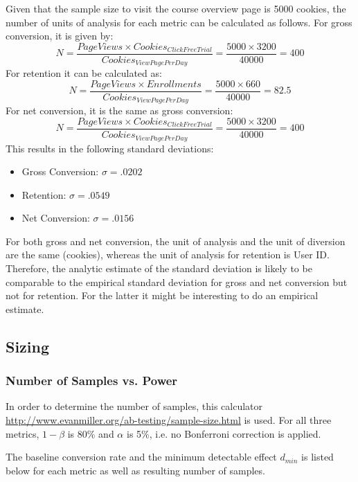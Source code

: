 \documentclass[11pt]{article} %
\begin{document}
\noindent Given that the sample size to visit the course overview page is 5000 cookies, the number of units of analysis for each metric can be calculated as follows. For gross conversion, it is given by:
\begin{equation}
     N = \frac{PageViews \times Cookies_{ClickFreeTrial}}{Cookies_{ViewPagePerDay}} = \frac{5000 \times 3200}{40000} = 400
\end{equation}
For retention it can be calculated as:
\begin{equation}
     N = \frac{PageViews \times Enrollments}{Cookies_{ViewPagePerDay}} = \frac{5000 \times 660}{40000} = 82.5
\end{equation}
For net conversion, it is the same as gross conversion:
\begin{equation}
     N = \frac{PageViews \times Cookies_{ClickFreeTrial}}{Cookies_{ViewPagePerDay}} = \frac{5000 \times 3200}{40000} = 400
\end{equation}
This results in the following standard deviations:
\begin{itemize}
\item Gross Conversion: $\sigma = .0202$
\item Retention: $\sigma = .0549$
\item Net Conversion: $\sigma =  .0156$
\end{itemize}

For both gross and net conversion, the unit of analysis and the unit of diversion are the same (cookies), whereas the unit of analysis for retention is User ID. Therefore, the analytic estimate of the standard deviation is likely to be comparable to the empirical standard deviation for gross and net conversion but not for retention. For the latter it might be interesting to do an empirical estimate.

\subsection{Sizing}
\subsubsection{Number of Samples vs. Power}

In order to determine the number of samples, this calculator \url{http://www.evanmiller.org/ab-testing/sample-size.html} is used. For all three metrics, $1-\beta$ is 80\% and $\alpha$ is 5\%, i.e. no Bonferroni correction is applied. 

The baseline conversion rate and the minimum detectable effect $d_{min}$ is listed below for each metric as well as resulting number of samples.
\end{document}
